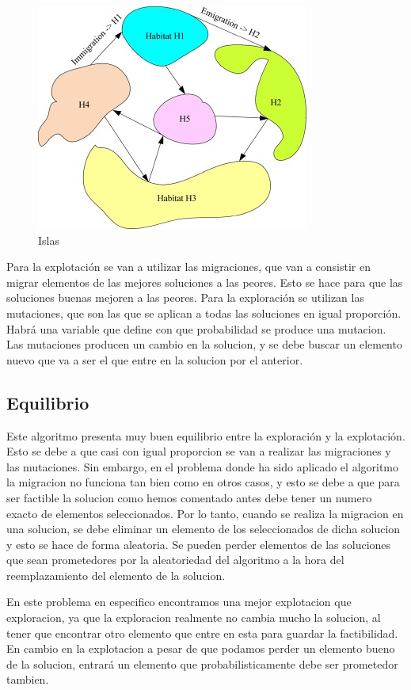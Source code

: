 \documentclass{article}
\begin{document}
\begin{figure}[h]
  \centering
  \includegraphics[scale=1]{Islas.png}
  \caption{Islas}
\end{figure}

Para la explotación se van a utilizar las migraciones, que van a consistir en migrar elementos de las mejores
soluciones a las peores. Esto se hace para que las soluciones buenas mejoren a las peores.
Para la exploración se utilizan las mutaciones, que son las que se aplican a todas las soluciones en igual proporción.
Habrá una variable que define con que probabilidad se produce una mutacion. Las mutaciones producen un cambio en la solucion, y se debe buscar un elemento 
nuevo que va a ser el que entre en la solucion por el anterior. 

\subsection{\normalsize Equilibrio}
Este algoritmo presenta muy buen equilibrio entre la exploración y la explotación. Esto se debe a que casi con igual proporcion se van 
a realizar las migraciones y las mutaciones.
Sin embargo, en el problema donde ha sido aplicado el algoritmo la migracion no funciona tan bien como en otros casos, y esto se debe a que 
para ser factible la solucion como hemos comentado antes debe tener un numero exacto de elementos seleccionados. Por lo tanto, cuando se 
realiza la migracion en una solucion, se debe eliminar un elemento de los seleccionados de dicha solucion y esto se hace de forma aleatoria.
Se pueden perder elementos de las soluciones que sean prometedores por la aleatoriedad del algoritmo a la hora del reemplazamiento del elemento de la 
solucion.

En este problema en especifico encontramos una mejor explotacion que exploracion, ya que la exploracion realmente no cambia mucho la solucion, al tener
que encontrar otro elemento que entre en esta para guardar la factibilidad.
En cambio en la explotacion a pesar de que podamos perder un elemento bueno de la solucion, entrará un elemento que probabilisticamente debe ser prometedor
tambien.
\end{document}
